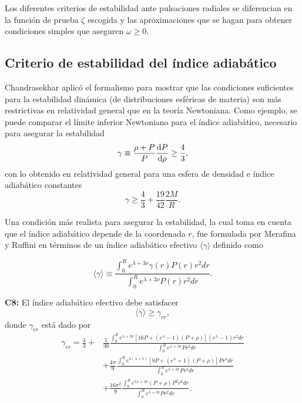 Los diferentes criterios de estabilidad ante pulsaciones radiales se diferencian en la función de prueba $\zeta$ escogida y las aproximaciones que se hagan para obtener condiciones simples que aseguren $\omega \geq 0$.


\subsection*{Criterio de estabilidad del índice adiabático }

\noindent Chandrasekhar aplicó el formalismo para mostrar que las condiciones suficientes para la estabilidad dinámica (de distribuciones esféricas de materia) son más restrictivas en relatividad general que en la teoría Newtoniana. Como ejemplo, se puede comparar el límite inferior Newtoniano para el índice adiabático, necesario para asegurar la  estabilidad
\begin{equation}
    \gamma \equiv \frac { \rho + P  } { P } \dv{P}{\rho} \geq \frac{4}{3},
\end{equation}
con lo obtenido en relatividad general para una esfera de densidad e índice adiabático constantes
\begin{equation}
    \gamma \geq \frac{4}{3} +  \frac{19}{42} \frac{2M}{R}.
\end{equation}

Una condición más realista para asegurar la estabilidad, la cual toma en cuenta que el índice adiabático depende de la coordenada $r$, fue formulada por Merafina y Ruffini \cite{Merafina1989} en términos de un índice adiabático efectivo $\langle\gamma\rangle$ definido como

\begin{equation}
    \langle\gamma\rangle\equiv\frac{\int_{0}^{R} e^{\lambda+3 \nu} \gamma(r) P(r) r^{2} d r}{\int_{0}^{R} e^{\lambda+3 \nu} P(r) r^{2} d r}.
\end{equation}

\textbf{C8:} El índice adiabático efectivo debe satisfacer
\begin{equation}
     \langle\gamma\rangle \geq \gamma_{cr},
\end{equation}
donde $\gamma_{cr}$ está dado por
\begin{align}
    \gamma_{cr} = \frac{4}{3} +& \frac{1}{36} \frac{\int_{0}^{R} e^{\lambda+3 \mathrm{v}}\left[16 P+\left(e^{\lambda}-1\right)\left(P+\rho \right)\right]\left(e^{\lambda}-1\right) r^{2} d r}{\int_{0}^{R} e^{\lambda+3 \mathrm{v}} P r^{2} d r} \nonumber
    \\ &+ \frac{4 \pi}{9} \frac{\int_{0}^{R} e^{3( \lambda+ \mathrm{v})}\left[8 P+\left(e^{\lambda}+1\right)\left(P+\rho \right)\right] P r^{4} d r}{\int_{0}^{R} e^{\lambda+3 \mathrm{v}} P r^{2} d r}
    \\ & + \frac{16 \pi^{2} }{9} \frac{\int_{0}^{R} e^{5 \lambda+3 v }\left(P+\rho \right) P^{2} r^{6} d r}{\int_{0}^{R} e^{\lambda+3 v } P r^{2} d r}. \nonumber
\end{align}

